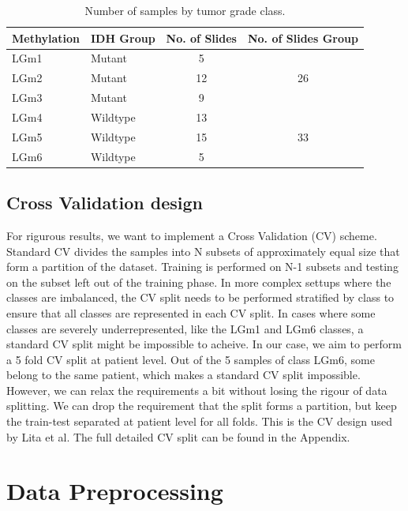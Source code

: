 \begin{table}[h]
\centering
\caption{Number of samples by tumor grade class.}
\label{tab:dataset}
\begin{tabular}{llcc}
\toprule
\textbf{Methylation} & \textbf{IDH Group} & \textbf{No. of Slides} & \textbf{No. of Slides Group} \\
\midrule
LGm1 & Mutant   & 5   \\
LGm2 & Mutant   & 12 & 26 \\
LGm3 & Mutant   & 9   \\
\midrule
LGm4 & Wildtype & 13  \\
LGm5 & Wildtype & 15 & 33\\
LGm6 & Wildtype & 5   \\
\bottomrule
\end{tabular}
\end{table}

\subsection{Cross Validation design}
For rigurous results, we want to implement a Cross Validation (CV) scheme. Standard CV divides the samples into N subsets of approximately equal size that form a partition of the dataset. Training is performed on N-1 subsets and testing on the subset left out of the training phase. In more complex settups where the classes are imbalanced, the CV split needs to be performed stratified by class to ensure that all classes are represented in each CV split. In cases where some classes are severely underrepresented, like the LGm1 and LGm6 classes, a standard CV split might be impossible to acheive. In our case, we aim to perform a 5 fold CV split at patient level. Out of the 5 samples of class LGm6, some belong to the same patient, which makes a standard CV split impossible. However, we can relax the requirements a bit without losing the rigour of data splitting. We can drop the requirement that the split forms a partition, but keep the train-test separated at patient level for all folds. This is the CV design used by Lita et al. The full detailed CV split can be found in the Appendix.

\section{Data Preprocessing}

